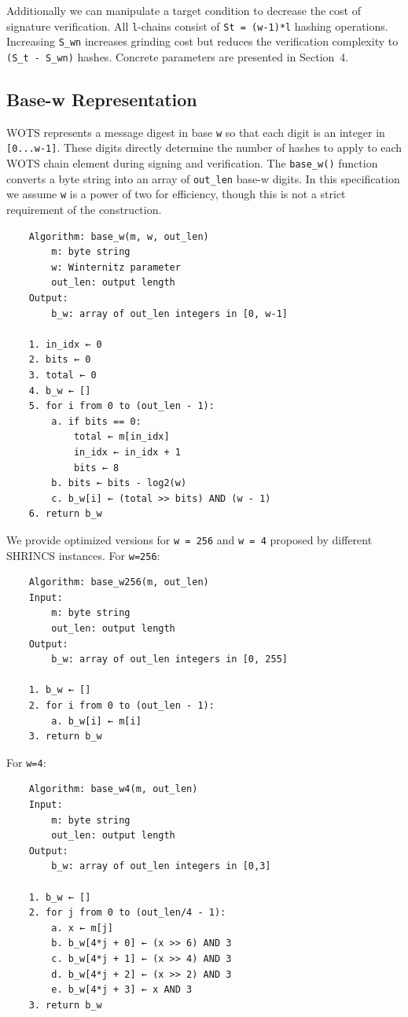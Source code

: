 Additionally we can manipulate a target condition to decrease the cost of signature verification. All \texttt{l}-chains consist of \texttt{St = (w-1)*l} hashing operations. Increasing \texttt{S\_wn} increases grinding cost but reduces the verification complexity to \texttt{(S\_t - S\_wn)} hashes. Concrete parameters are presented in Section~4.

\subsection{Base-w Representation}
WOTS represents a message digest in base \texttt{w} so that each digit is an integer in \texttt{[0...w-1]}. These digits directly determine the number of hashes to apply to each WOTS chain element during signing and verification. The \texttt{base\_w()} function converts a byte string into an array of \texttt{out\_len} base-w digits. In this specification we assume \texttt{w} is a power of two for efficiency, though this is not a strict requirement of the construction.

\begin{verbatim}
    Algorithm: base_w(m, w, out_len) 
        m: byte string
        w: Winternitz parameter
        out_len: output length
    Output: 
        b_w: array of out_len integers in [0, w-1]
    
    1. in_idx ← 0
    2. bits ← 0
    3. total ← 0
    4. b_w ← []
    5. for i from 0 to (out_len - 1):
        a. if bits == 0:
            total ← m[in_idx]
            in_idx ← in_idx + 1
            bits ← 8
        b. bits ← bits - log2(w)
        c. b_w[i] ← (total >> bits) AND (w - 1)
    6. return b_w
\end{verbatim} 

We provide optimized versions for \texttt{w = 256} and \texttt{w = 4} proposed by different SHRINCS instances. For \texttt{w=256}:
\begin{verbatim}
    Algorithm: base_w256(m, out_len)
    Input:
        m: byte string
        out_len: output length 
    Output:
        b_w: array of out_len integers in [0, 255]

    1. b_w ← []
    2. for i from 0 to (out_len - 1):
        a. b_w[i] ← m[i]
    3. return b_w
\end{verbatim}
For \texttt{w=4}:
\begin{verbatim}
    Algorithm: base_w4(m, out_len)
    Input:
        m: byte string
        out_len: output length
    Output:
        b_w: array of out_len integers in [0,3]

    1. b_w ← []
    2. for j from 0 to (out_len/4 - 1):
        a. x ← m[j]
        b. b_w[4*j + 0] ← (x >> 6) AND 3
        c. b_w[4*j + 1] ← (x >> 4) AND 3
        d. b_w[4*j + 2] ← (x >> 2) AND 3
        e. b_w[4*j + 3] ← x AND 3
    3. return b_w
\end{verbatim}

